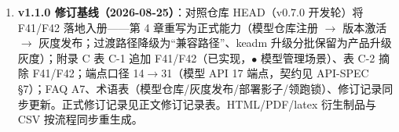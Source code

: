 \begin{enumerate}
  \item \textbf{v1.1.0 修订基线（2026-08-25）}：对照仓库 HEAD（v0.7.0 开发轮）将 F41/F42 落地入册——第 4 章重写为正式能力（模型仓库注册 $\rightarrow$ 版本激活 $\rightarrow$ 灰度发布；过渡路径降级为“兼容路径”、keadm 升级分批保留为产品升级灰度）；附录 C 表 C-1 追加 F41/F42（已实现，$\bullet$ 模型管理场景）、表 C-2 摘除 F41/F42；端点口径 14$\rightarrow$31（模型 API 17 端点，契约见 API-SPEC §7）；FAQ A7、术语表（模型仓库/灰度发布/部署影子/领跑锁）、修订记录同步更新。正式修订记录见正文修订记录表。HTML/PDF/latex 衍生制品与 CSV 按流程同步重生成。
\end{enumerate}
